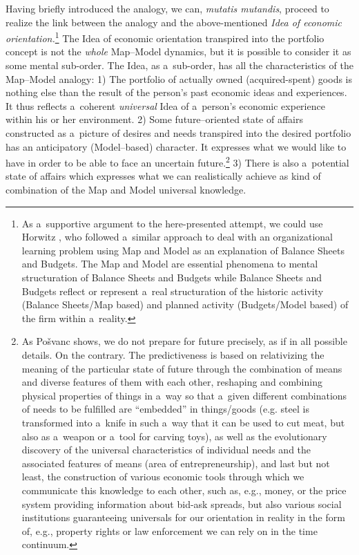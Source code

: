 Having briefly introduced the analogy, we can, \textit{mutatis mutandis}, proceed to realize the link between the analogy and the above-mentioned \textit{Idea of economic orientation.}\footnote{As a~supportive argument to the here-presented attempt, we could use Horwitz 
\parencite*[][]{}, %
 who followed a~similar approach to deal with an organizational learning problem using Map and Model as an explanation of Balance Sheets and Budgets. The Map and Model are essential phenomena to mental structuration of Balance Sheets and Budgets while Balance Sheets and Budgets reflect or represent a~real structuration of the historic activity (Balance Sheets/Map based) and planned activity (Budgets/Model based) of the firm within a~reality. } The Idea of economic orientation transpired into the portfolio concept is not the \textit{whole} Map–Model dynamics, but it is possible to consider it as some mental sub-order. The Idea, as a~sub-order, has all the characteristics of the Map–Model analogy: 1) The portfolio of actually owned (acquired-spent) goods is nothing else than the result of the person's past economic ideas and experiences. It thus reflects a~coherent \textit{universal} Idea of a~person's economic experience within his or her environment. 2) Some future–oriented state of affairs constructed as a~picture of desires and needs transpired into the desired portfolio has an anticipatory (Model–based) character. It expresses what we would like to have in order to be able to face an uncertain future.\footnote{As Pošvanc 
\parencite*[][]{} %
 shows, we do not prepare for future precisely, as if in all possible details. On the contrary. The predictiveness is based on relativizing the meaning of the particular state of future through the combination of means and diverse features of them with each other, reshaping and combining physical properties of things in a~way so that a~given different combinations of needs to be fulfilled are ``embedded'' in things/goods (e.g. steel is transformed into a~knife in such a~way that it can be used to cut meat, but also as a~weapon or a~tool for carving toys), as well as the evolutionary discovery of the universal characteristics of individual needs and the associated features of means (area of entrepreneurship), and last but not least, the construction of various economic tools through which we communicate this knowledge to each other, such as, e.g., money, or the price system providing information about bid-ask spreads, but also various social institutions guaranteeing universals for our orientation in reality in the form of, e.g., property rights or law enforcement we can rely on in the time continuum. } 3) There is also a~potential state of affairs which expresses what we can realistically achieve as kind of combination of the Map and Model universal knowledge.




